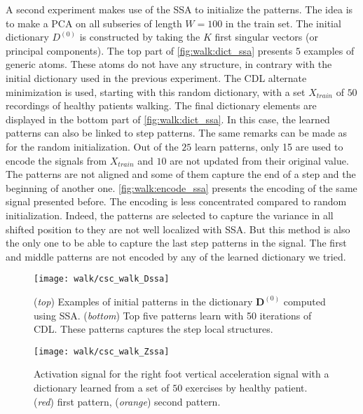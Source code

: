 \documentclass[../thesis.tex]{subfiles}
\begin{document}
{A second experiment makes use of the SSA to initialize the patterns. The idea is to make a PCA on all subseries of length $W = 100$ in the train set. The initial dictionary $D^{(0)}$ is constructed by taking the $K$ first singular vectors (or principal components). The top part of \autoref{fig:walk:dict_ssa} presents $5$ examples of generic atoms. These atoms do not have any structure, in contrary with the initial dictionary used in the previous experiment. The CDL alternate minimization is used, starting with this random dictionary, with a set $X_{train}$ of $50$ recordings of healthy patients walking. The final dictionary elements are displayed in the bottom part of \autoref{fig:walk:dict_ssa}. In this case, the learned patterns can also be linked to step patterns. The same remarks can be made as for the random initialization. Out of the $25$ learn patterns, only 15 are used to encode the signals from $X_{train}$ and $10$ are not updated from their original value. The patterns are not aligned and some of them capture the end of a step and the beginning of another one. \autoref{fig:walk:encode_ssa} presents the encoding of the same signal presented before. The encoding is less concentrated compared to random initialization. Indeed, the patterns are selected to capture the variance in all shifted position to they are not well localized with SSA. But this method is also the only one to be able to capture the last step patterns in the signal. The first and middle patterns are not encoded by any of the learned dictionary we tried.


\begin{figure}[tp]
	\centering
\texttt{[image: walk/csc\_walk\_Dssa]}
	\caption{(\emph{top}) Examples of initial patterns in the dictionary $\pmb D^{(0)}$ computed using SSA. (\emph{bottom}) Top five patterns learn with 50 iterations of CDL. These patterns captures the step local structures.}
	\label{fig:walk:dict_ssa}
\end{figure}


\begin{figure}[tp]
	\centering
	\texttt{[image: walk/csc\_walk\_Zssa]}
	\caption{Activation signal for the right foot vertical acceleration signal with
			 a dictionary learned from a set of $50$ exercises by healthy patient.
			 (\emph{red}) first pattern, (\emph{orange}) second pattern.}
	\label{fig:walk:encode_ssa}
\end{figure}

}
\end{document}
